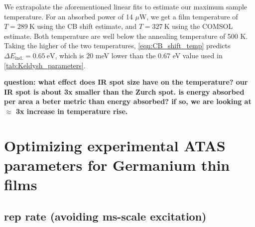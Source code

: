 We extrapolate the aforementioned linear fits to estimate our maximum sample temperature. For an absorbed power of 14 $\mu$W, we get a film temperature of $T = 289 \ \textrm{K}$ using the CB shift estimate, and $T = 327 \ \textrm{K}$ using the COMSOL estimate. Both temperature are well below the annealing temperature of 500 K. Taking the higher of the two temperatures, \cref{eqn:CB_shift_temp} predicts $\Delta E_{\textrm{ind.}} = 0.65 \ \textrm{eV}$, which is 20 meV lower than the 0.67 eV value used in \cref{tab:Keldysh_parameters}.

\textbf{question: what effect does IR spot size have on the temperature? our IR spot is about 3x smaller than the Zurch spot. is energy absorbed per area a beter metric than energy absorbed? if so, we are looking at $\approx$ 3x increase in temperature rise.}


\section{Optimizing experimental ATAS parameters for Germanium thin films}

\subsection{rep rate (avoiding ms-scale excitation)}

